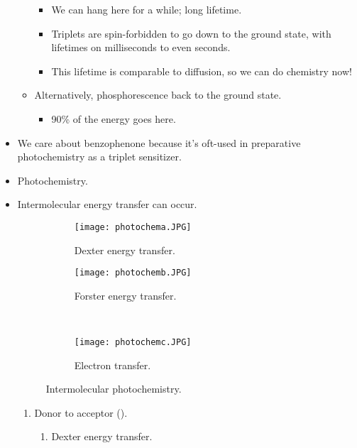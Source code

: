 \documentclass[../notes.tex]{subfiles}
\begin{document}
\begin{itemize}
\begin{itemize}
\begin{itemize}
            \item We can hang here for a while; long lifetime.
            \item Triplets are spin-forbidden to go down to the ground state, with lifetimes on milliseconds to even seconds.
            \item This lifetime is comparable to diffusion, so we can do chemistry now!
        \end{itemize}
        \item Alternatively, phosphorescence back to the ground state.
        \begin{itemize}
            \item 90\% of the energy goes here.
        \end{itemize}
    \end{itemize}
    \item We care about benzophenone because it's oft-used in preparative photochemistry as a triplet sensitizer.
    \item Photochemistry.
    \item Intermolecular energy transfer can occur.
    \begin{figure}[h!]
        \centering
        \begin{subfigure}[b]{0.35\linewidth}
            \centering
            \texttt{[image: photochema.JPG]}
            \caption{Dexter energy transfer.}
            \label{fig:photochema}
        \end{subfigure}
        \begin{subfigure}[b]{0.35\linewidth}
            \centering
            \texttt{[image: photochemb.JPG]}
            \caption{Forster energy transfer.}
            \label{fig:photochemb}
        \end{subfigure}\\[2em]
        \begin{subfigure}[b]{\linewidth}
            \centering
            \texttt{[image: photochemc.JPG]}
            \caption{Electron transfer.}
            \label{fig:photochemc}
        \end{subfigure}
        \caption{Intermolecular photochemistry.}
        \label{fig:photochem}
    \end{figure}
    \begin{enumerate}
        \item Donor to acceptor ().
        \begin{enumerate}
            \item Dexter energy transfer.

\end{enumerate}
\end{enumerate}
\end{itemize}
\end{document}
